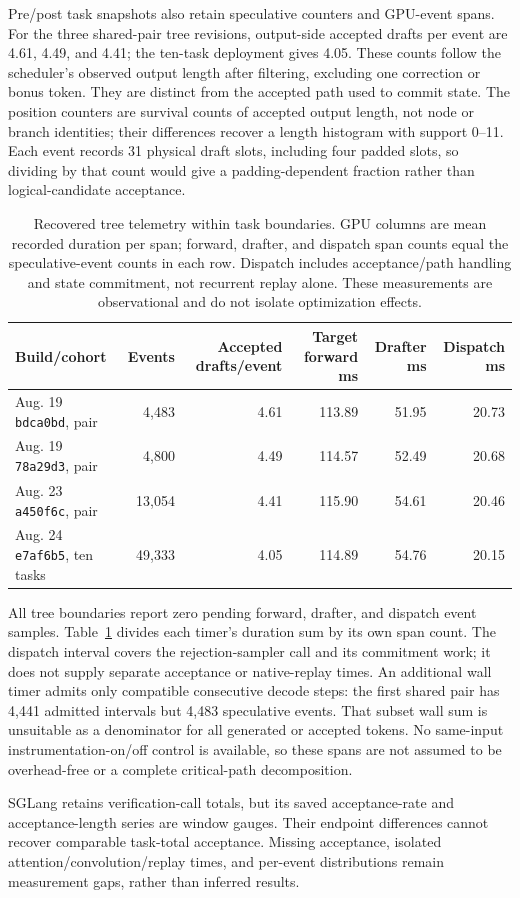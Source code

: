 Pre/post task snapshots also retain speculative counters and GPU-event spans. For the three shared-pair tree revisions, output-side accepted drafts per event are 4.61, 4.49, and 4.41; the ten-task deployment gives 4.05. These counts follow the scheduler's observed output length after filtering, excluding one correction or bonus token. They are distinct from the accepted path used to commit state. The position counters are survival counts of accepted output length, not node or branch identities; their differences recover a length histogram with support 0--11. Each event records 31 physical draft slots, including four padded slots, so dividing by that count would give a padding-dependent fraction rather than logical-candidate acceptance.

\begin{table}[t]
\caption{Recovered tree telemetry within task boundaries. GPU columns are mean recorded duration per span; forward, drafter, and dispatch span counts equal the speculative-event counts in each row. Dispatch includes acceptance/path handling and state commitment, not recurrent replay alone. These measurements are observational and do not isolate optimization effects.}
\label{tab:recovered-telemetry}
\centering\small
\begin{tabular}{@{}lrrrrr@{}}
\toprule
Build/cohort & Events & Accepted drafts/event & Target forward ms & Drafter ms & Dispatch ms \\
\midrule
Aug. 19 \texttt{bdca0bd}, pair & 4,483 & 4.61 & 113.89 & 51.95 & 20.73 \\
Aug. 19 \texttt{78a29d3}, pair & 4,800 & 4.49 & 114.57 & 52.49 & 20.68 \\
Aug. 23 \texttt{a450f6c}, pair & 13,054 & 4.41 & 115.90 & 54.61 & 20.46 \\
Aug. 24 \texttt{e7af6b5}, ten tasks & 49,333 & 4.05 & 114.89 & 54.76 & 20.15 \\
\bottomrule
\end{tabular}
\end{table}

All tree boundaries report zero pending forward, drafter, and dispatch event samples. Table~\ref{tab:recovered-telemetry} divides each timer's duration sum by its own span count. The dispatch interval covers the rejection-sampler call and its commitment work; it does not supply separate acceptance or native-replay times. An additional wall timer admits only compatible consecutive decode steps: the first shared pair has 4,441 admitted intervals but 4,483 speculative events. That subset wall sum is unsuitable as a denominator for all generated or accepted tokens. No same-input instrumentation-on/off control is available, so these spans are not assumed to be overhead-free or a complete critical-path decomposition.

SGLang retains verification-call totals, but its saved acceptance-rate and acceptance-length series are window gauges. Their endpoint differences cannot recover comparable task-total acceptance. Missing acceptance, isolated attention/convolution/replay times, and per-event distributions remain measurement gaps, rather than inferred results.
